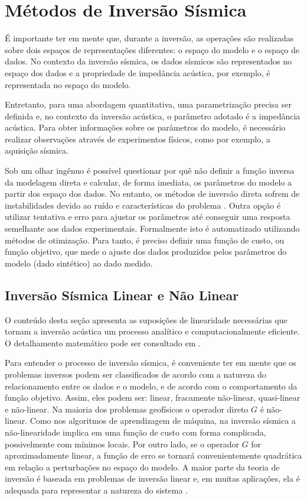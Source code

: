 \section{Métodos de Inversão Sísmica}
É importante ter em mente que, durante a inversão, as operações são realizadas
sobre dois espaços de representações diferentes: o espaço do modelo e o espaço de dados.
No contexto da inversão sísmica, os dados sísmicos são representados no espaço
dos dados e a propriedade de impedância acústica, por exemplo, é representada
no espaço do modelo.

Entretanto, para uma abordagem quantitativa, uma parametrização precisa ser definida \cite{tarantola} e,
no contexto da inversão acústica, o parâmetro adotado é a impedância acústica.
Para obter informações sobre os parâmetros do modelo, é necessário
realizar observações através de experimentos físicos, como por exemplo, a
aquisição sísmica.

Sob um olhar ingênuo é possível questionar por quê não definir a
função inversa da modelagem direta e calcular, de forma imediata,
os parâmetros do modelo a partir dos espaço dos dados.
No entanto, os métodos de inversão direta sofrem de instabilidades
devido ao ruído e características do problema \citep[p. 50]{sen_livro}. Outra
opção é utilizar tentativa e erro para ajustar os parâmetros até conseguir uma
resposta semelhante aos dados experimentais. Formalmente isto é automatizado
utilizando métodos de otimização. Para tanto, é preciso definir uma função de
custo, ou função objetivo, que mede o ajuste dos dados produzidos pelos
parâmetros do modelo (dado sintético) ao dado medido.

\subsection{Inversão Sísmica Linear e Não Linear}
O conteúdo desta seção apresenta as suposições de linearidade necessárias
que tornam a inversão acústica um processo analítico e computacionalmente
eficiente. O detalhamento matemático pode ser consultado em \cite{Figueiredo2014,Figueiredo17}.

Para entender o processo de inversão sísmica, é conveniente ter em mente
que os problemas inversos podem ser classificados de acordo com a natureza
do relacionamento entre os dados e o modelo, e de acordo com o comportamento da função objetivo.
Assim, eles podem ser: linear, fracamente não-linear, quasi-linear e não-linear.
Na maioria dos problemas geofísicos o operador direto $G$ é não-linear.
Como nos algoritmos de aprendizagem de máquina, na inversão sísmica
a não-linearidade implica em uma função de custo com forma complicada,
possivelmente com mínimos locais.
Por outro lado, se o operador $G$ for aproximadamente linear, a
função de erro se tornará convenientemente quadrática em relação a perturbações
no espaço do modelo. A maior parte da teoria de inversão é baseada em problemas
de inversão linear e, em muitas aplicações, ela é 
adequada para representar a natureza do sistema \cite{sen_livro}.

